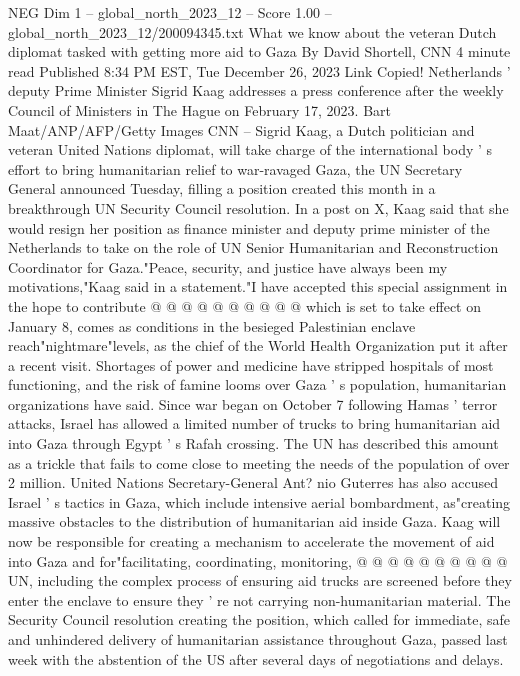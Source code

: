 \begin{textsample}{NEG Dim 1 – global\_north\_2023\_12 – Score 1.00 – global\_north\_2023\_12/200094345.txt}  \label{ex:f1_neg_198}
What we know about the veteran Dutch diplomat tasked with getting more aid to Gaza By David Shortell, CNN 4 minute read Published 8:34 PM EST, Tue December 26, 2023 Link Copied!
Netherlands ' deputy Prime Minister Sigrid Kaag addresses a press conference after the weekly Council of Ministers in The Hague on February 17, 2023.
Bart Maat/ANP/AFP/Getty Images CNN -- Sigrid Kaag, a Dutch politician and veteran United Nations diplomat, will take charge of the international body ' s effort to bring humanitarian relief to war-ravaged Gaza, the UN Secretary General announced Tuesday, filling a position created this month in a breakthrough UN Security Council resolution.
In a post on X, Kaag said that she would resign her position as finance minister and deputy prime minister of the Netherlands to take on the role of UN Senior Humanitarian and Reconstruction Coordinator for Gaza."Peace, security, and justice have always been my motivations,"Kaag said in a statement."I have accepted this special assignment in the hope to contribute @ @ @ @ @ @ @ @ @ @ which is set to take effect on January 8, comes as conditions in the besieged Palestinian enclave reach"nightmare"levels, as the chief of the World Health Organization put it after a recent visit.
Shortages of power and medicine have stripped hospitals of most functioning, and the risk of famine looms over Gaza ' s population, humanitarian organizations have said.
Since war began on October 7 following Hamas ' terror attacks, Israel has allowed a limited number of trucks to bring humanitarian aid into Gaza through Egypt ' s Rafah crossing.
The UN has described this amount as a trickle that fails to come close to meeting the needs of the population of over 2 million.
United Nations Secretary-General Ant? nio Guterres has also accused Israel ' s tactics in Gaza, which include intensive aerial bombardment, as"creating massive obstacles to the distribution of humanitarian aid inside Gaza.
Kaag will now be responsible for creating a mechanism to accelerate the movement of aid into Gaza and for"facilitating, coordinating, monitoring, @ @ @ @ @ @ @ @ @ @ UN, including the complex process of ensuring aid trucks are screened before they enter the enclave to ensure they ' re not carrying non-humanitarian material.
The Security Council resolution creating the position, which called for immediate, safe and unhindered delivery of humanitarian assistance throughout Gaza, passed last week with the abstention of the US after several days of negotiations and delays.

\end{textsample}
